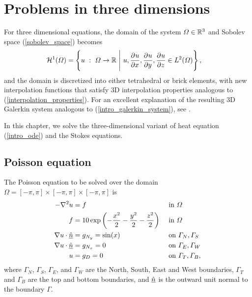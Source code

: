 
\chapter{Problems in three dimensions}

For three dimensional equations, the domain of the system $\varOmega \in \mathbb{R}^3$ and Sobolev space (\ref{sobolev_space}) becomes
\begin{align}
  \label{3d_sobolev_space}
  \mathcal{H}^1(\Omega) &= \left\{ u\ :\ \Omega \rightarrow \R\ \Bigg|\ u, \parder{u}{x}, \parder{u}{y}, \parder{u}{z} \in L^2(\Omega) \right\},
\end{align}
and the domain is discretized into either tetrahedral or brick elements, with new interpolation functions that satisfy 3D interpolation properties analogous to (\ref{interpolation_properties}).  For an excellent explanation of the resulting 3D Galerkin system analogous to (\ref{intro_galerkin_system}), see \citet{elman_2005}.

In this chapter, we solve the three-dimensional variant of heat equation (\ref{intro_ode}) and the Stokes equations.


\section{Poisson equation}

The Poisson equation to be solved over the domain $\Omega = [-\pi,\pi] \times [-\pi,\pi] \times [-\pi,\pi]$ is
\begin{align}
  \label{3d_poisson_start}
  -\nabla^2 u &= f &&\text{ in } \varOmega \\
  f &= 10 \exp\left( -\frac{x^2}{2} - \frac{y^2}{2} - \frac{z^2}{2}\right) &&\text{ in } \varOmega \\
  \nabla u \cdot \underline{\hat{n}} &= g_{N_y} = \sin(x) &&\text{ on } \varGamma_N, \varGamma_S \\
  \nabla u \cdot \underline{\hat{n}} &= g_{N_x} = 0 &&\text{ on } \varGamma_E, \varGamma_W \\
  \label{3d_poisson_end}
  u &= g_D = 0 &&\text{ on } \varGamma_T, \varGamma_B,
\end{align}
where $\Gamma_N$, $\Gamma_S$, $\Gamma_E$, and $\Gamma_W$ are the North, South, East and West boundaries, $\Gamma_T$ and $\Gamma_B$ are the top and bottom boundaries, and $\underline{\hat{n}}$ is the outward unit normal to the boundary $\Gamma$.

